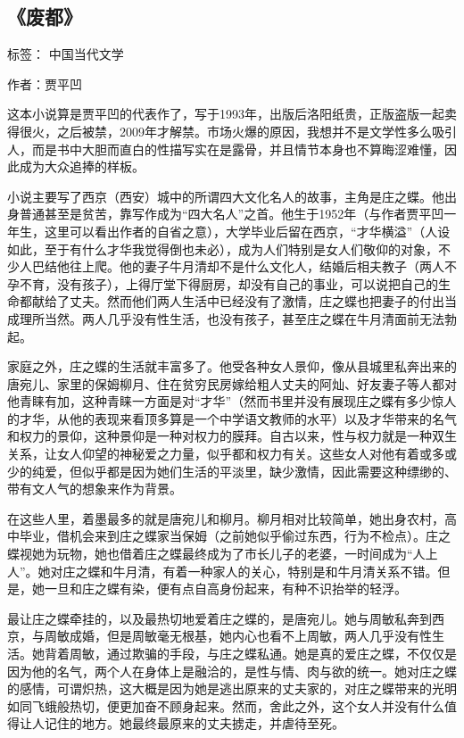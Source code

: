\subsection{《废都》}

标签： 中国当代文学


作者：贾平凹

这本小说算是贾平凹的代表作了，写于1993年，出版后洛阳纸贵，正版盗版一起卖得很火，之后被禁，2009年才解禁。市场火爆的原因，我想并不是文学性多么吸引人，而是书中大胆而直白的性描写实在是露骨，并且情节本身也不算晦涩难懂，因此成为大众追捧的样板。

小说主要写了西京（西安）城中的所谓四大文化名人的故事，主角是庄之蝶。他出身普通甚至是贫苦，靠写作成为“四大名人”之首。他生于1952年（与作者贾平凹一年生，这里可以看出作者的自省之意），大学毕业后留在西京，“才华横溢”（人设如此，至于有什么才华我觉得倒也未必），成为人们特别是女人们敬仰的对象，不少人巴结他往上爬。他的妻子牛月清却不是什么文化人，结婚后相夫教子（两人不孕不育，没有孩子），上得厅堂下得厨房，却没有自己的事业，可以说把自己的生命都献给了丈夫。然而他们两人生活中已经没有了激情，庄之蝶也把妻子的付出当成理所当然。两人几乎没有性生活，也没有孩子，甚至庄之蝶在牛月清面前无法勃起。

家庭之外，庄之蝶的生活就丰富多了。他受各种女人景仰，像从县城里私奔出来的唐宛儿、家里的保姆柳月、住在贫穷民房嫁给粗人丈夫的阿灿、好友妻子等人都对他青睐有加，这种青睐一方面是对“才华”（然而书里并没有展现庄之蝶有多少惊人的才华，从他的表现来看顶多算是一个中学语文教师的水平）以及才华带来的名气和权力的景仰，这种景仰是一种对权力的膜拜。自古以来，性与权力就是一种双生关系，让女人仰望的神秘爱之力量，似乎都和权力有关。这些女人对他有着或多或少的纯爱，但似乎都是因为她们生活的平淡里，缺少激情，因此需要这种缥缈的、带有文人气的想象来作为背景。

在这些人里，着墨最多的就是唐宛儿和柳月。柳月相对比较简单，她出身农村，高中毕业，借机会来到庄之蝶家当保姆（之前她似乎偷过东西，行为不检点）。庄之蝶视她为玩物，她也借着庄之蝶最终成为了市长儿子的老婆，一时间成为“人上人”。她对庄之蝶和牛月清，有着一种家人的关心，特别是和牛月清关系不错。但是，她一旦和庄之蝶有染，便有点自高身份起来，有种不识抬举的轻浮。

最让庄之蝶牵挂的，以及最热切地爱着庄之蝶的，是唐宛儿。她与周敏私奔到西京，与周敏成婚，但是周敏毫无根基，她内心也看不上周敏，两人几乎没有性生活。她背着周敏，通过欺骗的手段，与庄之蝶私通。她是真的爱庄之蝶，不仅仅是因为他的名气，两个人在身体上是融洽的，是性与情、肉与欲的统一。她对庄之蝶的感情，可谓炽热，这大概是因为她是逃出原来的丈夫家的，对庄之蝶带来的光明如同飞蛾般热切，便更加奋不顾身起来。然而，舍此之外，这个女人并没有什么值得让人记住的地方。她最终最原来的丈夫掳走，并虐待至死。

